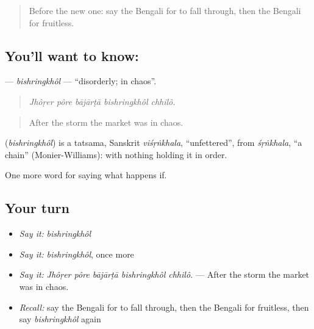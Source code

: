 \begin{quote}
Before the new one: say the Bengali for to fall through, then the Bengali for fruitless.
\end{quote}

\subsection*{You'll want to know: }
\textbf{} — \emph{bishringkhôl} — \textquotedblleft{}disorderly; in chaos\textquotedblright{}.

\begin{quote}
    
\end{quote}

\begin{quote}
\emph{Jhôṛer pôre bājārṭā bishringkhôl chhilô.}
\end{quote}

\begin{quote}
After the storm the market was in chaos.
\end{quote}

\begin{cousinweb}
\textbf{} (\emph{bishringkhôl}) is a tatsama, Sanskrit \emph{viśṛṅkhala}, \textquotedblleft{}unfettered\textquotedblright{}, from \emph{śṛṅkhala}, \textquotedblleft{}a chain\textquotedblright{} (Monier-Williams): with nothing holding it in order.
\end{cousinweb}

\begin{grammarlens}[title={What you've built}]
One more word for saying what happens if.
\end{grammarlens}

\subsection*{Your turn}
\begin{itemize}
\raggedright
  \item \emph{Say it:} \emph{bishringkhôl}
  \item \emph{Say it:} \emph{bishringkhôl}, once more
  \item \emph{Say it:} \emph{Jhôṛer pôre bājārṭā bishringkhôl chhilô.} — After the storm the market was in chaos.
  \item \emph{Recall:} say the Bengali for to fall through, then the Bengali for fruitless, then say \emph{bishringkhôl} again
\end{itemize}

